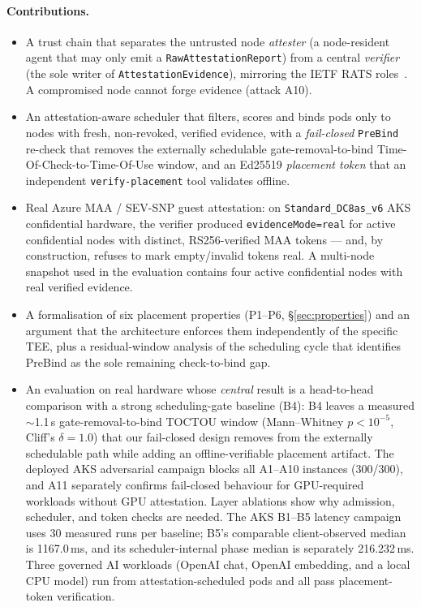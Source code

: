 \paragraph{Contributions.}
\begin{itemize}
  \item A trust chain that separates the untrusted node \emph{attester} (a
  node-resident agent that may only emit a \texttt{RawAttestationReport}) from a
  central \emph{verifier} (the sole writer of \texttt{AttestationEvidence}),
  mirroring the IETF RATS roles~\cite{birkholz2023rats}. A compromised node
  cannot forge evidence (attack A10).
  \item An attestation-aware scheduler that filters, scores and binds pods only
  to nodes with fresh, non-revoked, verified evidence, with a \emph{fail-closed}
  \texttt{PreBind} re-check that removes the externally schedulable
  gate-removal-to-bind Time-Of-Check-to-Time-Of-Use window, and an Ed25519
  \emph{placement token} that an independent
  \texttt{verify-placement} tool validates offline.
  \item Real Azure MAA / SEV-SNP guest attestation: on
  \texttt{Standard\_DC8as\_v6} AKS confidential hardware, the verifier produced
  \texttt{evidenceMode=real} for active confidential nodes with distinct,
  RS256-verified MAA tokens --- and, by construction, refuses to mark
  empty/invalid tokens real. A multi-node snapshot used in the evaluation
  contains four active confidential nodes with real verified evidence.
  \item A formalisation of six placement properties (P1--P6,
  \S\ref{sec:properties}) and an argument that the architecture enforces them
  independently of the specific TEE, plus a residual-window analysis of the
  scheduling cycle that identifies PreBind as the sole remaining check-to-bind
  gap.
  \item An evaluation on real hardware whose \emph{central} result is a
  head-to-head comparison with a strong scheduling-gate baseline (B4): B4 leaves
  a measured $\sim$1.1\,s gate-removal-to-bind TOCTOU window (Mann--Whitney
  $p<10^{-5}$, Cliff's $\delta{=}1.0$) that our fail-closed design removes from
  the externally schedulable path while adding an offline-verifiable placement
  artifact. The deployed AKS adversarial campaign blocks all A1--A10 instances
  (300/300), and A11 separately confirms fail-closed behaviour for GPU-required
  workloads without GPU attestation. Layer ablations show why admission,
  scheduler, and token checks are needed. The AKS B1--B5 latency campaign uses
  30 measured runs per baseline; B5's comparable client-observed median is
  1167.0\,ms, and its scheduler-internal phase median is separately
  216.232\,ms.
  Three governed AI workloads (OpenAI chat, OpenAI embedding, and a local CPU
  model) run from attestation-scheduled pods and all pass placement-token
  verification.
\end{itemize}

